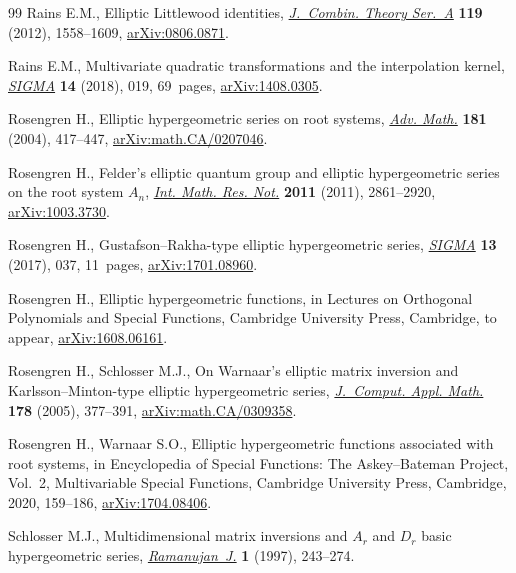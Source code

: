 \documentclass[pdftex]{sigma}%
\numberwithin{equation}{section}
\begin{document}
\begin{thebibliography}{99}
Rains E.M., Elliptic {L}ittlewood identities, \href{https://doi.org/10.1016/j.jcta.2012.03.001}{\textit{J.~Combin. Theory Ser.~A}}
 \textbf{119} (2012), 1558--1609, \href{https://arxiv.org/abs/0806.0871}{arXiv:0806.0871}.

Rains E.M., Multivariate quadratic transformations and the interpolation
 kernel, \href{https://doi.org/10.3842/SIGMA.2018.019}{\textit{SIGMA}} \textbf{14} (2018), 019, 69~pages, \href{https://arxiv.org/abs/1408.0305}{arXiv:1408.0305}.

Rosengren H., Elliptic hypergeometric series on root systems, \href{https://doi.org/10.1016/S0001-8708(03)00071-9}{\textit{Adv.
 Math.}} \textbf{181} (2004), 417--447, \href{https://arxiv.org/abs/math.CA/0207046}{arXiv:math.CA/0207046}.

Rosengren H., Felder's elliptic quantum group and elliptic hypergeometric
 series on the root system {$A_n$}, \href{https://doi.org/10.1093/imrn/rnq184}{\textit{Int. Math. Res. Not.}}
 \textbf{2011} (2011), 2861--2920, \href{https://arxiv.org/abs/1003.3730}{arXiv:1003.3730}.

Rosengren H., Gustafson--{R}akha-type elliptic hypergeometric series,
 \href{https://doi.org/10.3842/SIGMA.2017.037}{\textit{SIGMA}} \textbf{13} (2017), 037, 11~pages, \href{https://arxiv.org/abs/1701.08960}{arXiv:1701.08960}.

Rosengren H., Elliptic hypergeometric functions, in Lectures on Orthogonal
 Polynomials and Special Functions, Cambridge University Press, Cambridge,
{t}o appear, \href{https://arxiv.org/abs/1608.06161}{arXiv:1608.06161}.

Rosengren H., Schlosser M.J., On {W}arnaar's elliptic matrix inversion and
 {K}arlsson--{M}inton-type elliptic hypergeometric series, \href{https://doi.org/10.1016/j.cam.2004.02.028}{\textit{J.~Comput.
 Appl. Math.}} \textbf{178} (2005), 377--391, \href{https://arxiv.org/abs/math.CA/0309358}{arXiv:math.CA/0309358}.

Rosengren H., Warnaar S.O., Elliptic hypergeometric functions associated with
 root systems, in Encyclopedia of Special Functions: The Askey--Bateman Project, Vol.~2, Multivariable Special Functions, Cambridge University Press, Cambridge, 2020, 159--186, \href{https://arxiv.org/abs/1704.08406}{arXiv:1704.08406}.

Schlosser M.J., Multidimensional matrix inversions and {$A_r$} and {$D_r$}
 basic hypergeometric series, \href{https://doi.org/10.1023/A:1009705129155}{\textit{Rama\-nujan~J.}} \textbf{1} (1997),
 243--274.


\end{thebibliography}
\end{document}
